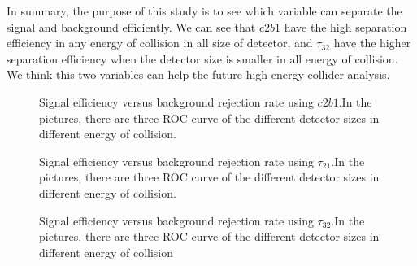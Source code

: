 In summary, the purpose of this study is to see which variable can separate the signal and background efficiently. We can see that $c2b1$ have the high separation efficiency in any energy of collision in all size of detector,  and $\tau_{32}$ have the higher separation efficiency when the detector size is smaller in all energy of collision. We think this two variables can help the future high energy collider analysis.\\
\label{sec:efficiency}


\begin{figure}
\begin{center}
\end{center}
\caption{Signal efficiency versus background rejection rate using $c2b1$.In the pictures, there are three ROC curve of the different detector sizes in different energy of collision.}
\label{fig:cluster_c2b1}
\end{figure}


\begin{figure}
\begin{center}
\end{center}
\caption{Signal efficiency versus background rejection rate using $\tau_{21}$.In the pictures, there are three ROC curve of the different detector sizes in different energy of collision.}
\label{fig:cluster_tau21}
\end{figure}


\begin{figure}
\begin{center}
\end{center}
\caption{Signal efficiency versus background rejection rate using $\tau_{32}$.In the pictures, there are three ROC curve of the different detector sizes in different energy of collision}
\label{fig:cluster_tau32}
\end{figure}

